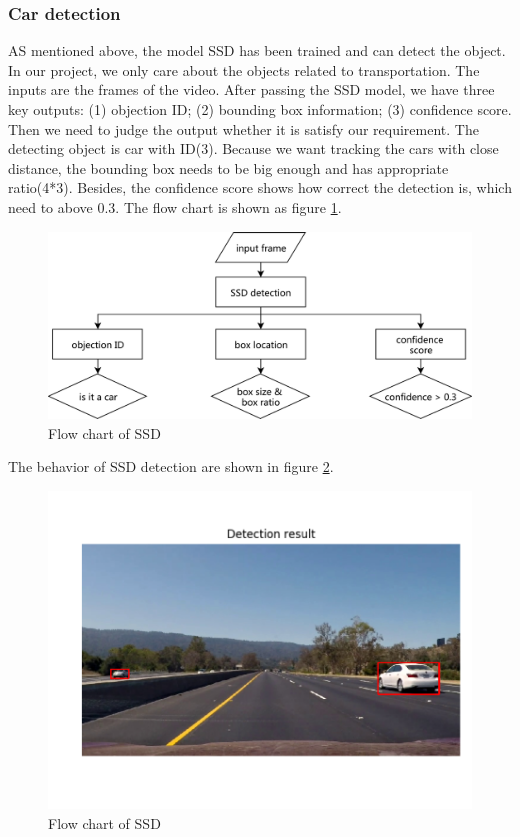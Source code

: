 \documentclass[10pt,twocolumn,letterpaper]{article}
\begin{document}
\subsubsection{Car detection}
AS mentioned above, the model SSD has been trained and can detect the object. In our project, we only care about the objects related to transportation. The inputs are the frames of the video. After passing the SSD model, we have three key outputs: (1) objection ID; (2) bounding box information; (3) confidence score. Then we need to judge the output whether it is satisfy our requirement. The detecting object is car with ID(3). Because we want tracking the cars with close distance, the bounding box needs to be big enough and has appropriate ratio(4*3). Besides, the confidence score shows how correct the detection is, which need to above 0.3. The flow chart is shown as figure \ref{fig:2_1_2}.\\
\begin{figure}[t]
\begin{center}
   \includegraphics[width=0.9\linewidth]{ssd_chart}
\end{center}
   \caption{Flow chart of SSD}
\label{fig:2_1_2}
\end{figure}
The behavior of SSD detection are shown in figure \ref{fig:2_1_3}.
\begin{figure}[t]
\begin{center}
   \includegraphics[width=0.9\linewidth]{ssd_consequence}
\end{center}
   \caption{Flow chart of SSD}
\label{fig:2_1_3}
\end{figure}
\end{document}
